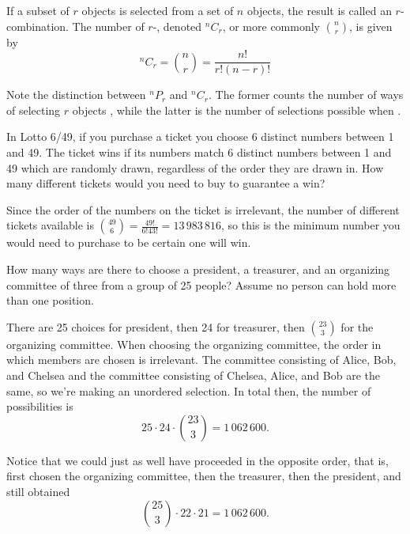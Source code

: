 
\begin{definition}\label{combinationdefinition}
If a subset of $r$ objects is selected from a set of $n$ objects, the result is called an $r$-combination. The number of $r$-, denoted $^nC_r$, or more commonly $\binom{n}{r}$, is given by
$$^nC_r = \binom{n}{r} = \frac{n!}{r!(n-r)!}$$
\end{definition}

\begin{warning}
Note the distinction between $^nP_r$ and $^nC_r$. The former counts the number of ways of selecting $r$ objects , while the latter is the number of selections possible when .
\end{warning}

\begin{example}
In Lotto 6/49, if you purchase a ticket you choose 6 distinct numbers between 1 and 49. The ticket wins if its numbers match 6 distinct numbers between 1 and 49 which are randomly drawn, regardless of the order they are drawn in. How many different tickets would you need to buy to guarantee a win?

Since the order of the numbers on the ticket is irrelevant, the number of different tickets available is $\binom{49}{6} = \frac{49!}{6!43!} = 13\,983\,816$, so this is the minimum number you would need to purchase to be certain one will win.
\end{example}

\begin{example}
How many ways are there to choose a president, a treasurer, and an organizing committee of three from a group of 25 people? Assume no person can hold more than one position.

There are 25 choices for president, then 24 for treasurer, then $\binom{23}{3}$ for the organizing committee. When choosing the organizing committee, the order in which members are chosen is irrelevant. The committee consisting of Alice, Bob, and Chelsea and the committee consisting of Chelsea, Alice, and Bob are the same, so we're making an unordered selection. In total then, the number of possibilities is
$$25 \cdot 24 \cdot \binom{23}{3} = 1\,062\,600.$$

Notice that we could just as well have proceeded in the opposite order, that is, first chosen the organizing committee, then the treasurer, then the president, and still obtained
$$\binom{25}{3} \cdot 22 \cdot 21 = 1\,062\,600.$$
\end{example}

